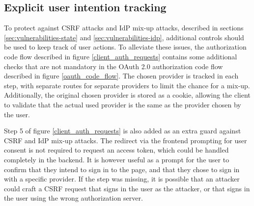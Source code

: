 \subsection{Explicit user intention tracking}
To protect against CSRF attacks and IdP mix-up attacks, described in sections \ref{sec:vulnerabilities-state} and \ref{sec:vulnerabilities-idp}, additional controls should be used to keep track of user actions.
To alleviate these issues, the authorization code flow described in figure \ref{client_auth_requests} contains some additional checks that are not mandatory in the OAuth 2.0 authorization code flow described in figure \ref{oauth_code_flow}.
The chosen provider is tracked in each step, with separate routes for separate providers to limit the chance for a mix-up.
Additionally, the original chosen provider is stored as a cookie, allowing the client to validate that the actual used provider is the same as the provider chosen by the user.

Step 5 of figure \ref{client_auth_requests}  is also added as an extra guard against CSRF and IdP mix-up attacks.
The redirect via the frontend prompting for user consent is not required to request an access token, which could be handled completely in the backend.
It is however useful as a prompt for the user to confirm that they intend to sign in to the page, and that they chose to sign in with a specific provider.
If the step was missing, it is possible that an attacker could craft a CSRF request that signs in the user as the attacker, or that signs in the user using the wrong authorization server.
